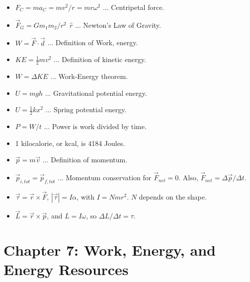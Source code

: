\documentclass[10pt]{article}
\begin{document}
\begin{itemize}
\item $F_C = m a_C = mv^2/r = mr\omega^2$ ... Centripetal force.
\item $\vec{F}_G = G m_1 m_2/r^2 ~~ \hat{r}$ ... Newton's Law of Gravity.
\item $W = \vec{F} \cdot \vec{d}$ ... Definition of Work, energy.
\item $KE = \frac{1}{2}mv^2$ ... Definition of kinetic energy.
\item $W = \Delta KE$ ... Work-Energy theorem.
\item $U = mgh$ ... Gravitational potential energy.
\item $U = \frac{1}{2}kx^2$ ... Spring potential energy.
\item $P = W/t$ ... Power is work divided by time.
\item 1 kilocalorie, or kcal, is 4184 Joules.
\item $\vec{p} = m\vec{v}$ ... Definition of momentum.
\item $\vec{p}_{i,tot} = \vec{p}_{f,tot}$ ... Momentum conservation for $\vec{F}_{net} = 0$.  Also, $\vec{F}_{net} = \Delta \vec{p} / \Delta t$.
\item $\vec{\tau} = \vec{r}\times \vec{F}$, $|\vec{\tau}| = I \alpha$, with $I = N m r^2$.  $N$ depends on the shape.
\item $\vec{L} = \vec{r} \times \vec{p}$, and $L = I\omega$, so $\Delta L/\Delta t = \tau$.
\end{itemize}

\section{Chapter 7: Work, Energy, and Energy Resources}
\end{document}
